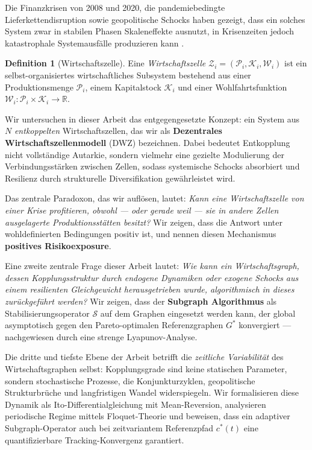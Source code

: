 ﻿\documentclass[a4paper,12pt]{article}
\theoremstyle{definition}
\newtheorem{definition}{Definition}
\begin{document}
Die Finanzkrisen von 2008 und 2020, die pandemiebedingte Lieferkettendisruption sowie
geopolitische Schocks haben gezeigt, dass ein solches System zwar in stabilen Phasen
Skaleneffekte ausnutzt, in Krisenzeiten jedoch katastrophale Systemausfälle produzieren kann
\citep{acemoglu2015systemic, haldane2011systemic}.

\begin{definition}[Wirtschaftszelle]
    Eine \emph{Wirtschaftszelle} $\mathcal{Z}_i = (\mathcal{P}_i, \mathcal{K}_i, \mathcal{W}_i)$
    ist ein selbst-organisiertes wirtschaftliches Subsystem bestehend aus einer
    Produktionsmenge $\mathcal{P}_i$, einem Kapitalstock $\mathcal{K}_i$ und einer
    Wohlfahrtsfunktion $\mathcal{W}_i : \mathcal{P}_i \times \mathcal{K}_i \to \mathbb{R}$.
\end{definition}

Wir untersuchen in dieser Arbeit das entgegengesetzte Konzept: ein System aus $N$
\emph{entkoppelten} Wirtschaftszellen, das wir als \textbf{Dezentrales Wirtschaftszellenmodell}
(DWZ) bezeichnen. Dabei bedeutet Entkopplung nicht vollständige Autarkie, sondern vielmehr
eine gezielte Modulierung der Verbindungsstärken zwischen Zellen, sodass systemische Schocks
absorbiert und Resilienz durch strukturelle Diversifikation gewährleistet wird.

Das zentrale Paradoxon, das wir auflösen, lautet: \emph{Kann eine Wirtschaftszelle von einer
Krise profitieren, obwohl --- oder gerade weil --- sie in andere Zellen ausgelagerte
Produktionsstätten besitzt?} Wir zeigen, dass die Antwort unter wohldefinierten Bedingungen
positiv ist, und nennen diesen Mechanismus \textbf{positives Risikoexposure}.

Eine zweite zentrale Frage dieser Arbeit lautet: \emph{Wie kann ein Wirtschaftsgraph, dessen
Kopplungsstruktur durch endogene Dynamiken oder exogene Schocks aus einem resilienten
Gleichgewicht herausgetrieben wurde, algorithmisch in dieses zurückgeführt werden?} Wir zeigen,
dass der \textbf{Subgraph Algorithmus} \citep{epp2026subgraph} als Stabilisierungsoperator
$\mathcal{S}$ auf dem Graphen eingesetzt werden kann, der global asymptotisch gegen den
Pareto-optimalen Referenzgraphen $G^*$ konvergiert --- nachgewiesen durch eine strenge
Lyapunov-Analyse.

Die dritte und tiefste Ebene der Arbeit betrifft die \emph{zeitliche Variabilität} des
Wirtschaftsgraphen selbst: Kopplungsgrade sind keine statischen Parameter, sondern
stochastische Prozesse, die Konjunkturzyklen, geopolitische Strukturbrüche und langfristigen
Wandel widerspiegeln. Wir formalisieren diese Dynamik als Ito-Differentialgleichung mit
Mean-Reversion, analysieren periodische Regime mittels Floquet-Theorie und beweisen, dass
ein adaptiver Subgraph-Operator auch bei zeitvariantem Referenzpfad $c^*(t)$ eine quantifizierbare
Tracking-Konvergenz garantiert.
\end{document}
